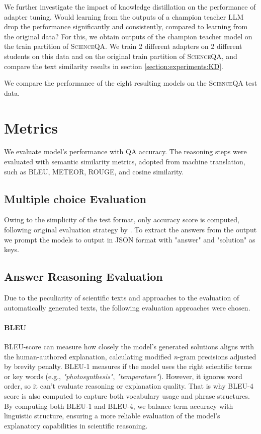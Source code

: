 \documentclass{article}
\begin{document}
We further investigate the impact of knowledge distillation on the performance of adapter tuning. Would learning from the outputs of a champion teacher LLM drop the performance significantly and consistently, compared to learning from the original data? For this, we obtain outputs of the champion teacher model on the train partition of \textsc{ScienceQA}. We train 2 different adapters on 2 different students on this data and on the original train partition of \textsc{ScienceQA}, and compare the text similarity results in section \ref{section:experiments:KD}. 

We compare the performance of the eight resulting models on the \textsc{ScienceQA} test data. 

\section{Metrics}
\label{section:metrics}

We evaluate model's performance with QA accuracy. %
The reasoning steps were evaluated with semantic similarity metrics, adopted from machine translation, such as BLEU, METEOR, ROUGE, and cosine similarity.
\subsection{Multiple choice Evaluation}
Owing to the simplicity of the test format, only accuracy score is computed, following original evaluation strategy by \cite{lu2022learn}. To extract the answers from the output we prompt the models to output in JSON format with "answer" and "solution" as keys.
\subsection{Answer Reasoning Evaluation}
Due to the peculiarity of scientific texts and approaches to the evaluation of automatically generated texts, the following evaluation approaches were chosen.

\paragraph{BLEU}
BLEU-score \cite{papineni2002bleu} can measure how closely the model's generated solutions aligns with the human-authored explanation, calculating modified \textit{n}-gram precisions adjusted by brevity penalty. BLEU-1 measures if the model uses the right scientific terms or key words (e.g., \textit{"photosynthesis"},  \textit{"temperature"}). However, it ignores word order, 
so it can’t evaluate reasoning or explanation quality. That is why BLEU-4 score is also computed to capture both vocabulary usage and phrase structures.
By computing both BLEU-1 and BLEU-4, we balance term accuracy with linguistic structure, ensuring a more reliable evaluation of the model’s explanatory capabilities in scientific reasoning.
\end{document}
